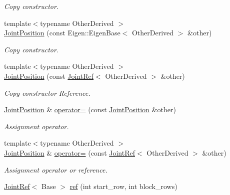 \begin{DoxyCompactItemize}
\begin{DoxyCompactList}\small\item\em Copy constructor. \end{DoxyCompactList}\item 
{\footnotesize template$<$typename Other\+Derived $>$ }\\\hyperlink{classow__core_1_1JointPosition_a10fe7d31f9b0af2fea545f72eb4c12b0}{Joint\+Position} (const Eigen\+::\+Eigen\+Base$<$ Other\+Derived $>$ \&other)
\begin{DoxyCompactList}\small\item\em Copy constructor. \end{DoxyCompactList}\item 
{\footnotesize template$<$typename Other\+Derived $>$ }\\\hyperlink{classow__core_1_1JointPosition_a6fcd27aecf8691a3c1c6ade60516f1dd}{Joint\+Position} (const \hyperlink{classow__core_1_1JointRef}{Joint\+Ref}$<$ Other\+Derived $>$ \&other)
\begin{DoxyCompactList}\small\item\em Copy constructor Reference. \end{DoxyCompactList}\item 
\hyperlink{classow__core_1_1JointPosition}{Joint\+Position} \& \hyperlink{classow__core_1_1JointPosition_ae939d0ccb8ada3afe2741ac3e85eae99}{operator=} (const \hyperlink{classow__core_1_1JointPosition}{Joint\+Position} \&other)\hypertarget{classow__core_1_1JointPosition_ae939d0ccb8ada3afe2741ac3e85eae99}{}\label{classow__core_1_1JointPosition_ae939d0ccb8ada3afe2741ac3e85eae99}

\begin{DoxyCompactList}\small\item\em Assignment operator. \end{DoxyCompactList}\item 
{\footnotesize template$<$typename Other\+Derived $>$ }\\\hyperlink{classow__core_1_1JointPosition}{Joint\+Position} \& \hyperlink{classow__core_1_1JointPosition_a0feca9940b4c967b8de129fee5a0f3cb}{operator=} (const \hyperlink{classow__core_1_1JointRef}{Joint\+Ref}$<$ Other\+Derived $>$ \&other)\hypertarget{classow__core_1_1JointPosition_a0feca9940b4c967b8de129fee5a0f3cb}{}\label{classow__core_1_1JointPosition_a0feca9940b4c967b8de129fee5a0f3cb}

\begin{DoxyCompactList}\small\item\em Assignment operator or reference. \end{DoxyCompactList}\item 
\hyperlink{classow__core_1_1JointRef}{Joint\+Ref}$<$ Base $>$ \hyperlink{classow__core_1_1JointPosition_a2be0486f14e525b1c4c39f5ff9c6408c}{ref} (int start\+\_\+row, int block\+\_\+rows)\hypertarget{classow__core_1_1JointPosition_a2be0486f14e525b1c4c39f5ff9c6408c}{}\label{classow__core_1_1JointPosition_a2be0486f14e525b1c4c39f5ff9c6408c}


\end{DoxyCompactItemize}
